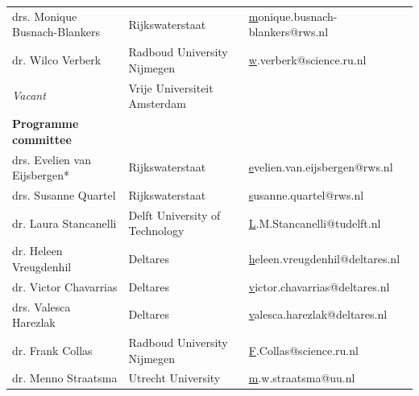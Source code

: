 \begin{longtable}{@{}lll@{}}
\rowcolor[HTML]{B9C6D5} 
drs. Monique Busnach-Blankers          & Rijkswaterstaat                                       & {\color[HTML]{0563C1} {\ul monique.busnach-blankers@rws.nl}} \\
\rowcolor[HTML]{C9D6D6} 
dr. Wilco Verberk                      & Radboud University   Nijmegen                         & {\color[HTML]{0563C1} {\ul w.verberk@science.ru.nl}}         \\
\rowcolor[HTML]{B9C6D5} 
\textit{Vacant}                        & Vrije Universiteit   Amsterdam                        & {\color[HTML]{0563C1} {\ul }}                                \\
\rowcolor[HTML]{C9D6D6} 
\textbf{Programme committee}           &                                                       &                                                              \\
\rowcolor[HTML]{B9C6D5} 
drs. Evelien van Eijsbergen*           & Rijkswaterstaat                                       & {\color[HTML]{0563C1} {\ul evelien.van.eijsbergen@rws.nl}}   \\
\rowcolor[HTML]{C9D6D6} 
drs. Susanne Quartel                   & Rijkswaterstaat                                      & {\color[HTML]{0563C1} {\ul susanne.quartel@rws.nl}}          \\
\rowcolor[HTML]{B9C6D5} 
dr. Laura Stancanelli                  & Delft University of   Technology                      & {\color[HTML]{0563C1} {\ul L.M.Stancanelli@tudelft.nl}}      \\
\rowcolor[HTML]{C9D6D6} 
dr. Heleen Vreugdenhil                 & Deltares                                           & {\color[HTML]{0563C1} {\ul heleen.vreugdenhil@deltares.nl}}  \\
\rowcolor[HTML]{B9C6D5} 
dr. Victor Chavarrias                  & Deltares                                              & {\color[HTML]{0563C1} {\ul victor.chavarrias@deltares.nl}}   \\
\rowcolor[HTML]{C9D6D6} 
drs. Valesca Harezlak                  & Deltares                                              & {\color[HTML]{0563C1} {\ul valesca.harezlak@deltares.nl}}    \\
\rowcolor[HTML]{B9C6D5} 
dr. Frank Collas                       & Radboud University   Nijmegen                         & {\color[HTML]{0563C1} {\ul F.Collas@science.ru.nl}}          \\
\rowcolor[HTML]{C9D6D6} 
dr. Menno Straatsma                    & Utrecht University                                    & {\color[HTML]{0563C1} {\ul m.w.straatsma@uu.nl}}             \\

\end{longtable}
